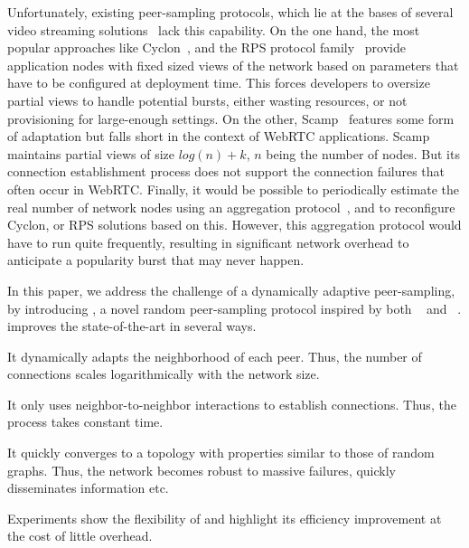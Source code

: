 Unfortunately, existing peer-sampling protocols, which lie at the
bases of several video streaming
solutions~\cite{Frey09Middleware,Abeni2009,smoothcache20} lack this
capability. On the one hand, the most popular approaches like
Cyclon~\cite{voulgaris2005cyclon}, and the RPS protocol
family~\cite{jelasity2007gossip} provide application nodes with fixed
sized views of the network based on parameters that have to be
configured at deployment time. This forces developers to oversize
partial views to handle potential bursts, either wasting resources, or
not provisioning for large-enough settings. On the other,
Scamp~\cite{ganesh2003peer} features some form of adaptation but falls
short in the context of WebRTC applications. Scamp maintains partial
views of size $log(n)+k$, $n$ being the number of nodes. But its
connection establishment process does not support the connection
failures that often occur in WebRTC. 
Finally, it would be possible to periodically estimate the real number
of network nodes using an aggregation
protocol~\cite{montresor2004robust}, and to reconfigure Cyclon, or RPS
solutions based on this. However, this aggregation protocol would have
to run quite frequently, resulting in significant network overhead
to anticipate a popularity burst that may never happen. 


In this paper, we address the challenge of a dynamically adaptive
peer-sampling, by introducing \SPRAY, a novel random peer-sampling
protocol inspired by both \SCAMP~\cite{ganesh2003peer} and
\CYCLON~\cite{voulgaris2005cyclon}. \SPRAY improves the
state-of-the-art in several ways.
\begin{inparaenum}[(i)]
\item It dynamically adapts the neighborhood of each peer. Thus, the
  number of connections scales logarithmically with the network size.
\item It only uses neighbor-to-neighbor interactions to establish
  connections. Thus, the process takes constant time.
\item It quickly converges to a topology with properties similar to
  those of random graphs. Thus, the network becomes robust to massive
  failures, quickly disseminates information etc.
\item Experiments show the flexibility of \SPRAY and highlight its
  efficiency improvement at the cost of little overhead.
\end{inparaenum}

